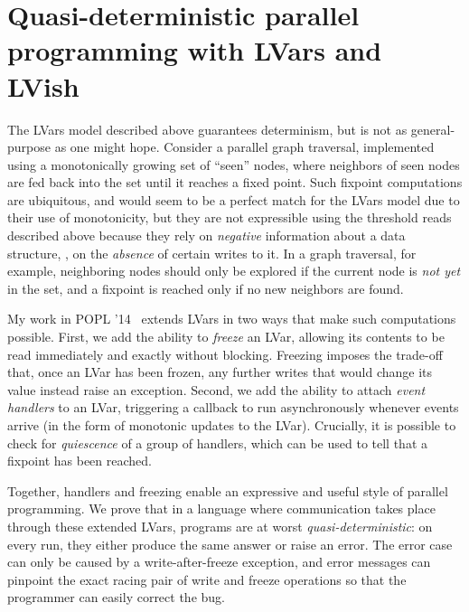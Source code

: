 \documentclass{article}
\begin{document}
\section{Quasi-deterministic parallel programming with LVars and LVish}\label{quasi}

The LVars model described above guarantees determinism, but is not as
general-purpose as one might hope.  Consider a parallel graph
traversal, implemented using a monotonically growing set of ``seen''
nodes, where neighbors of seen nodes are fed back into the set until
it reaches a fixed point.  Such fixpoint computations are ubiquitous,
and would seem to be a perfect match for the LVars model due to their
use of monotonicity, but they are not expressible using the threshold
reads described above because they rely on \emph{negative} information
about a data structure, \ie, on the \emph{absence} of certain writes
to it.  In a graph traversal, for example, neighboring nodes should
only be explored if the current node is \emph{not yet} in the set, and
a fixpoint is reached only if no new neighbors are found.

My work in POPL '14~\cite{Freeze-paper, Freeze-TR} extends LVars in
two ways that make such computations possible.  First, we add the
ability to \emph{freeze} an LVar, allowing its contents to be read
immediately and exactly without blocking. Freezing imposes the
trade-off that, once an LVar has been frozen, any further writes that
would change its value instead raise an exception.  Second, we add the
ability to attach \emph{event handlers} to an LVar, triggering a
callback to run asynchronously whenever events arrive (in the form of
monotonic updates to the LVar).  Crucially, it is possible to check
for \emph{quiescence} of a group of handlers, which can be used to
tell that a fixpoint has been reached.

Together, handlers and freezing enable an expressive and useful style
of parallel programming.  We prove that in a language where
communication takes place through these extended LVars, programs are
at worst \emph{quasi-deterministic}: on every run, they either produce
the same answer or raise an error.  The error case can only be caused
by a write-after-freeze exception, and error messages can pinpoint the
exact racing pair of write and freeze operations so that the
programmer can easily correct the bug.
\end{document}
